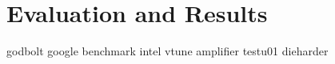 \documentclass{stdlocal}
\begin{document}
  \section{Evaluation and Results} %
  \label{sec:evaluation}
    godbolt
    google benchmark
    intel vtune amplifier
    testu01
    dieharder
\end{document}
